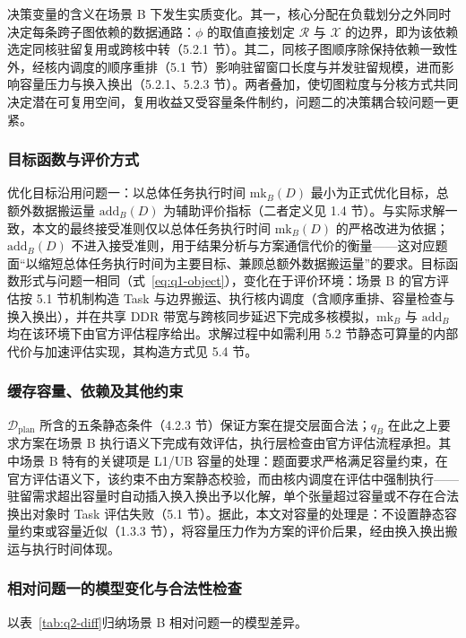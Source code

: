 决策变量的含义在场景 B 下发生实质变化。其一，核心分配在负载划分之外同时决定每条跨子图依赖的数据通路：$\phi$ 的取值直接划定 $\mathcal{R}$ 与 $\mathcal{X}$ 的边界，即为该依赖选定同核驻留复用或跨核中转（5.2.1 节）。其二，同核子图顺序除保持依赖一致性外，经核内调度的顺序重排（5.1 节）影响驻留窗口长度与并发驻留规模，进而影响容量压力与换入换出（5.2.1、5.2.3 节）。两者叠加，使切图粒度与分核方式共同决定潜在可复用空间，复用收益又受容量条件制约，问题二的决策耦合较问题一更紧。

\subsubsection{目标函数与评价方式}
优化目标沿用问题一：以总体任务执行时间 $\mathrm{mk}_B(D)$ 最小为正式优化目标，总额外数据搬运量 $\mathrm{add}_B(D)$ 为辅助评价指标（二者定义见 1.4 节）。与实际求解一致，本文的最终接受准则仅以总体任务执行时间 $\mathrm{mk}_B(D)$ 的严格改进为依据；$\mathrm{add}_B(D)$ 不进入接受准则，用于结果分析与方案通信代价的衡量——这对应题面“以缩短总体任务执行时间为主要目标、兼顾总额外数据搬运量”的要求。目标函数形式与问题一相同（式~\ref{eq:q1-object}），变化在于评价环境：场景 B 的官方评估按 5.1 节机制构造 Task 与边界搬运、执行核内调度（含顺序重排、容量检查与换入换出），并在共享 DDR 带宽与跨核同步延迟下完成多核模拟，$\mathrm{mk}_B$ 与 $\mathrm{add}_B$ 均在该环境下由官方评估程序给出。求解过程中如需利用 5.2 节静态可算量的内部代价与加速评估实现，其构造方式见 5.4 节。

\subsubsection{缓存容量、依赖及其他约束}
$\mathcal{D}_{\mathrm{plan}}$ 所含的五条静态条件（4.2.3 节）保证方案在提交层面合法；$q_B$ 在此之上要求方案在场景 B 执行语义下完成有效评估，执行层检查由官方评估流程承担。其中场景 B 特有的关键项是 L1/UB 容量的处理：题面要求严格满足容量约束，在官方评估语义下，该约束不由方案静态校验，而由核内调度在评估中强制执行——驻留需求超出容量时自动插入换入换出予以化解，单个张量超过容量或不存在合法换出对象时 Task 评估失败（5.1 节）。据此，本文对容量的处理是：不设置静态容量约束或容量近似（1.3.3 节），将容量压力作为方案的评价后果，经由换入换出搬运与执行时间体现。

\subsubsection{相对问题一的模型变化与合法性检查}
以表~\ref{tab:q2-diff}归纳场景 B 相对问题一的模型差异。

